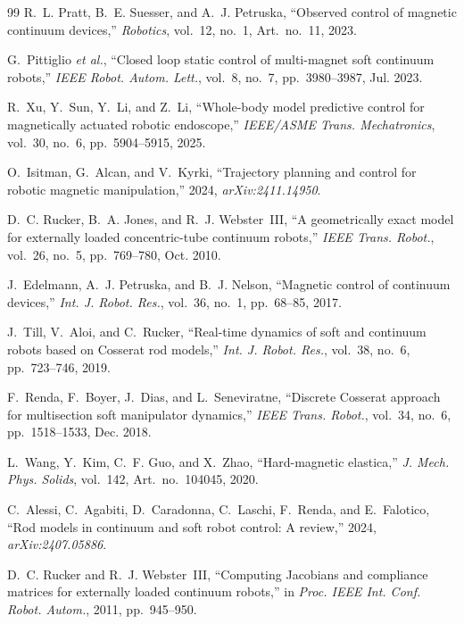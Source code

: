 \documentclass[journal]{IEEEtran}
\begin{document}
\begin{thebibliography}{99}
R.~L. Pratt, B.~E. Suesser, and A.~J. Petruska, ``Observed control of
magnetic continuum devices,'' \emph{Robotics}, vol.~12, no.~1,
Art.~no.~11, 2023.

G.~Pittiglio \emph{et al.}, ``Closed loop static control of multi-magnet
soft continuum robots,'' \emph{IEEE Robot. Autom. Lett.}, vol.~8, no.~7,
pp.~3980--3987, Jul. 2023.

R.~Xu, Y.~Sun, Y.~Li, and Z.~Li, ``Whole-body model predictive control for
magnetically actuated robotic endoscope,'' \emph{IEEE/ASME Trans.
Mechatronics}, vol.~30, no.~6, pp.~5904--5915, 2025.

O.~Isitman, G.~Alcan, and V.~Kyrki, ``Trajectory planning and control for
robotic magnetic manipulation,'' 2024, \emph{arXiv:2411.14950}.

D.~C. Rucker, B.~A. Jones, and R.~J. Webster~III, ``A geometrically exact
model for externally loaded concentric-tube continuum robots,''
\emph{IEEE Trans. Robot.}, vol.~26, no.~5, pp.~769--780, Oct. 2010.

J.~Edelmann, A.~J. Petruska, and B.~J. Nelson, ``Magnetic control of
continuum devices,'' \emph{Int. J. Robot. Res.}, vol.~36, no.~1,
pp.~68--85, 2017.

J.~Till, V.~Aloi, and C.~Rucker, ``Real-time dynamics of soft and
continuum robots based on Cosserat rod models,'' \emph{Int. J. Robot.
Res.}, vol.~38, no.~6, pp.~723--746, 2019.

F.~Renda, F.~Boyer, J.~Dias, and L.~Seneviratne, ``Discrete Cosserat
approach for multisection soft manipulator dynamics,'' \emph{IEEE Trans.
Robot.}, vol.~34, no.~6, pp.~1518--1533, Dec. 2018.

L.~Wang, Y.~Kim, C.~F. Guo, and X.~Zhao, ``Hard-magnetic elastica,''
\emph{J. Mech. Phys. Solids}, vol.~142, Art.~no.~104045, 2020.

C.~Alessi, C.~Agabiti, D.~Caradonna, C.~Laschi, F.~Renda, and E.~Falotico,
``Rod models in continuum and soft robot control: A review,''
2024, \emph{arXiv:2407.05886}.

D.~C. Rucker and R.~J. Webster~III, ``Computing Jacobians and compliance
matrices for externally loaded continuum robots,'' in \emph{Proc. IEEE
Int. Conf. Robot. Autom.}, 2011, pp.~945--950.


\end{thebibliography}
\end{document}
